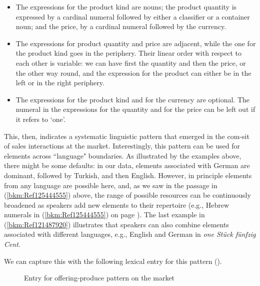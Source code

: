 \begin{itemize}
\item The expressions for the product kind are nouns; the product quantity is expressed by a cardinal numeral followed by either a classifier or a container noun; and the price, by a cardinal numeral followed by the currency.
\item The expressions for product quantity and price are adjacent, while the one for the product kind goes in the periphery. Their linear order with respect to each other is variable: we can have first the quantity and then the price, or the other way round, and the expression for the product can either be in the left or in the right periphery.
\item The expressions for the product kind and for the currency are optional. The numeral in the expressions for the quantity and for the price can be left out if it refers to ‘one’.
\end{itemize}

This, then, indicates a systematic linguistic pattern that emerged in the com-sit of sales interactions at the market. Interestingly, this pattern can be used for elements across “language" boundaries. As illustrated by the examples above, there might be some defaults: in our data, elements associated with German are dominant, followed by Turkish, and then English. However, in principle elements from any language are possible here, and, as we saw in the passage in (\ref{bkm:Ref125444555}) above, the range of possible resources can be continuously broadened as speakers add new elements to their repertoire (e.g., Hebrew numerals in (\ref{bkm:Ref125444555}) on page \pageref{bkm:Ref125444555}). The last example in (\ref{bkm:Ref121487920}) illustrates that speakers can also combine elements associated with different languages, e.g., English and German in \textit{one Stück fünfzig Cent}.

We can capture this with the following lexical entry for this pattern ().

\begin{figure}[H]
\caption{Entry for offering-produce pattern on the market}
\label{fig:13}
\end{figure}

